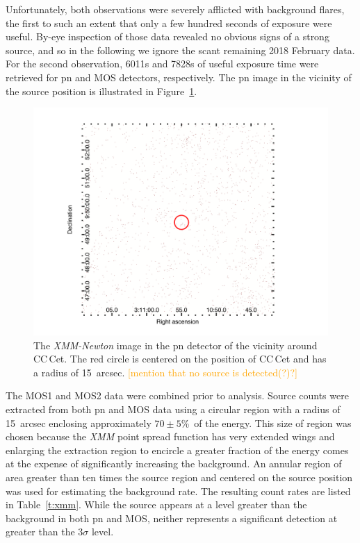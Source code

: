 \documentclass[fleqn,usenatbib]{mnras}
\newcommand{\bgc}[1]{\textcolor{orange}{[#1]}}
\begin{document}
Unfortunately, both observations were severely afflicted with background flares, the first to such an extent that only a few hundred seconds of exposure were useful.  By-eye inspection of those data revealed no obvious signs of a strong source, and so in the following we ignore the scant remaining 2018 February data. For the second observation, 6011s and 7828s of useful exposure time were retrieved for pn and MOS detectors, respectively. The pn image in the vicinity of the source position is illustrated in Figure~\ref{f:pn}.

\begin{figure}
    \centering
    \includegraphics[width=\columnwidth]{ds9.pdf}
    \caption{The {\it XMM-Newton} image in the pn detector of the vicinity around CC\,Cet. The red circle is centered on the position of CC\,Cet and has a radius of 15~arcsec. \bgc{mention that no source is detected(?)?}}  
    \label{f:pn}
\end{figure}

The MOS1 and MOS2 data were combined prior to analysis. Source counts were extracted from both pn and MOS data using a circular region with a radius of 15~arcsec enclosing approximately $70\pm 5$\%\ of the energy.  This size of region was chosen because the \textit{XMM} point spread function has very extended wings and enlarging the extraction region to encircle a greater fraction of the energy comes at the expense of significantly increasing the background.  An annular region of area greater than ten times the source region and centered on the source position was used for estimating the background rate.  The resulting count rates are listed in Table~\ref{t:xmm}. While the source appears at a level greater than the background in both pn and MOS, neither represents a significant detection at greater than the $3\sigma$ level.   
\end{document}
